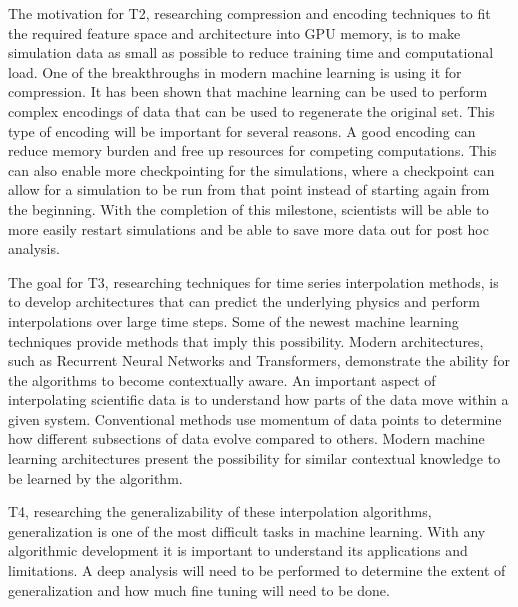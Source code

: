 \documentclass[12pt]{article}
\begin{document}
The motivation for T2, researching compression and encoding techniques to  
fit the required feature space and architecture into GPU memory, is to make
simulation data as small as possible to reduce training time and 
computational load. One of the breakthroughs in modern machine learning is using
it for compression. It has been shown that machine learning can be used to
perform complex encodings of data that can be used to regenerate the original
set. This type of encoding will be important for several reasons. A
good encoding can reduce memory burden and free up resources for
competing computations. This can also enable more checkpointing for the
simulations, where a checkpoint can allow for a simulation to be run from that
point instead of starting again from the beginning. With the completion of this
milestone, scientists will be able to more easily restart simulations and be able
to save more data out for post hoc analysis.

The goal for T3, researching techniques for time series interpolation methods,
is to develop architectures that can predict the underlying physics and perform
interpolations over large time steps. Some of the newest machine learning
techniques provide methods that imply this possibility. Modern architectures,
such as Recurrent Neural Networks and Transformers, demonstrate the
ability for the algorithms to become contextually aware. An important aspect of
interpolating scientific data is to understand how parts of the data move within
a given system. Conventional methods use momentum of data points to determine
how different subsections of data evolve compared to others. Modern machine
learning architectures present the possibility for similar contextual knowledge
to be learned by the algorithm.

T4, researching the generalizability of these
interpolation algorithms, generalization is one of the most difficult tasks in
machine learning. With any algorithmic development it is important to understand
its applications and limitations. A deep analysis will need to be performed to
determine the extent of generalization and how much fine tuning will need to be
done. 
\end{document}
